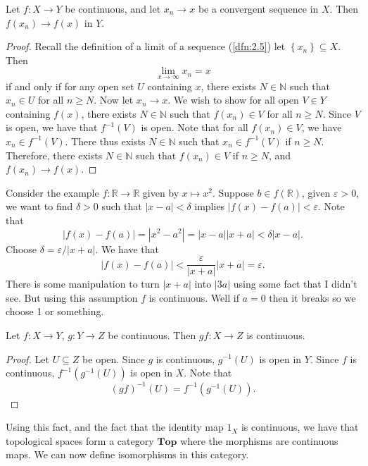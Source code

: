 \begin{theorem}\label{thm:2.3}
	Let $f : X \to Y$ be continuous, and let $x_n\to x$ be a convergent sequence in $X$. Then $f(x_n)\to f(x)$ in $Y$.
\end{theorem}
\begin{proof}
	Recall the definition of a limit of a sequence (\ref{dfn:2.5}) let $\left\{ x_n \right\} \subseteq X$. Then
	\[
	\lim_{x \to \infty} x_n=x
	\]
	if and only if for any open set $U $ containing $x$, there exists $N\in\mathbb{N} $ such that $x_n\in U$ for all $n\geq N$. Now let $x_n\to x$. We wish to show for all open $V\in Y$ containing $f(x)$, there exists $N\in\mathbb{N} $ such that $f(x_n)\in V$ for all $n\geq N$. Since $V$ is open, we have that $f^{-1} (V)$ is open. Note that for all $f(x_n)\in V$, we have $x_n\in f^{-1} (V)$. There thus exists $N\in\mathbb{N} $ such that $x_n\in f^{-1} (V)$ if $n\geq N$. Therefore, there exists $N\in\mathbb{N} $ such that $f(x_n)\in V$ if $n\geq N$, and $f(x_n)\to f(x)$.
\end{proof}

Consider the example $f : \mathbb{R}  \to \mathbb{R} $ given by $x\mapsto x^2$. Suppose $b\in f(\mathbb{R} )$, given $\varepsilon >0$, we want to find $\delta >0$ such that $\left| x-a \right| <\delta $ implies $\left| f(x)-f(a) \right| <\varepsilon $. Note that
\[
	\left| f(x)-f(a) \right| =\left| x^2-a^2 \right| =\left| x-a \right| \left| x+a \right| < \delta \left| x-a \right| 
.\]
Choose $\delta =\varepsilon /\left| x+a \right|$. We have that
\[
	\left| f(x)-f(a) \right| < \frac{\varepsilon }{\left| x+a \right| } \left| x+a \right| =\varepsilon 
.\]
There is some manipulation to turn $\left| x+a \right| $ into $\left| 3a \right| $ using some fact that I didn't see. But using this assumption $f$ is continuous. Well if $a=0$ then it breaks so we choose 1 or something.

\begin{proposition}\label{prp:2.11}
	Let $f : X \to Y$, $g : Y \to Z$ be continuous. Then $gf : X \to Z$ is continuous.
\end{proposition}
\begin{proof}
	Let $U\subseteq Z$ be open. Since $g$ is continuous, $g^{-1} (U)$ is open in $Y$. Since $f$ is continuous, $f^{-1} (g^{-1} (U))$ is open in $X$. Note that
	\[
		(gf)^{-1} (U)=f^{-1} (g^{-1} (U))
	.\]
\end{proof}

Using this fact, and the fact that the identity map $1_{X} $ is continuous, we have that topological spaces form a category $\mathbf{Top} $ where the morphisms are continuous maps. We can now define isomorphisms in this category.

